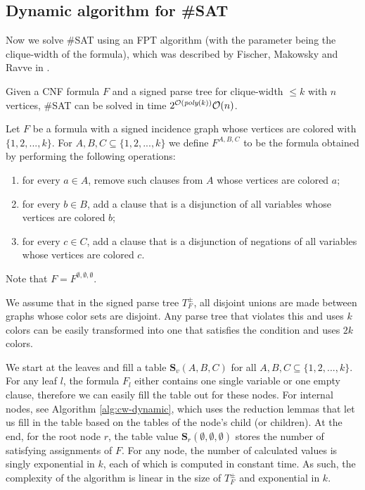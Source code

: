 \subsection{Dynamic algorithm for \#SAT}

Now we solve \#SAT using an FPT algorithm (with the parameter being the clique-width of the formula), which was described by Fischer, Makowsky and Ravve in \cite{DBLP:journals/dam/FischerMR08}.

\begin{theorem}
	Given a CNF formula $F$ and a signed parse tree for clique-width $\leq k$ with $n$ vertices, \#SAT can be solved in time $2^{\mathcal{O}(\text{\em poly}(k))} \mathcal{O}(n)$.
\end{theorem}

\noindent
Let $F$ be a formula with a signed incidence graph whose vertices are colored with $\{ 1, 2, ..., k \}$.
For $A,B,C \subseteq \{ 1, 2, ..., k \}$ we define $F^{A,B,C}$ to be the formula obtained by performing the following operations:
\begin{enumerate}
	\item for every $a \in A$, remove such clauses from $A$ whose vertices are colored $a$;
	\item for every $b \in B$, add a clause that is a disjunction of all variables whose vertices are colored $b$;
	\item for every $c \in C$, add a clause that is a disjunction of negations of all variables whose vertices are colored $c$.
\end{enumerate}
\noindent
Note that $F = F^{\emptyset, \emptyset, \emptyset}$.

We assume that in the signed parse tree $T^{\pm}_F$, all disjoint unions are made between graphs whose color sets are disjoint.
Any parse tree that violates this and uses $k$ colors can be easily transformed into one that satisfies the condition and uses $2k$ colors.

We start at the leaves and fill a table $\mathbf{S}_v(A,B,C)$ for all $A,B,C \subseteq \{1, 2, ..., k \}$.
For any leaf $l$, the formula $F_l$ either contains one single variable or one empty clause, therefore we can easily fill the table out for these nodes.
For internal nodes, see Algorithm \ref{alg:cw-dynamic}, which uses the reduction lemmas that let us fill in the table based on the tables of the node's child (or children).
At the end, for the root node $r$, the table value $\mathbf{S}_r(\emptyset, \emptyset, \emptyset)$ stores the number of satisfying assignments of $F$.
For any node, the number of calculated values is singly exponential in $k$, each of which is computed in constant time.
As such, the complexity of the algorithm is linear in the size of $T^{\pm}_F$ and exponential in $k$.




